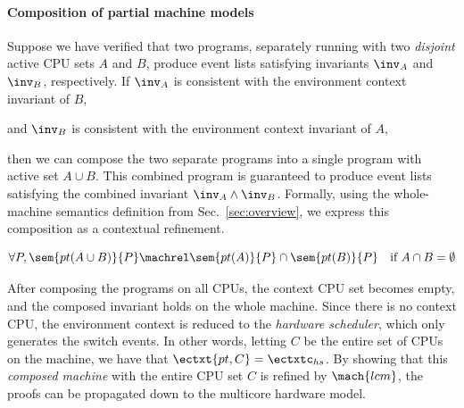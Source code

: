 
\paragraph{Composition of partial machine models}
Suppose we have verified that two programs, separately running with two 
\emph{disjoint} active CPU sets $A$ and $B$, produce event lists
satisfying invariants $\inv_A$ and $\inv_B$, respectively.
If $\inv_A$ is consistent with the environment context invariant
of $B$,
and $\inv_B$ is consistent with the environment context invariant of 
$A$,
then we can compose the two separate programs into a single program
with active set $A \cup B$.
This combined program is guaranteed to produce event lists
satisfying the combined invariant $\inv_A \wedge \inv_B$.
Formally, using the whole-machine semantics definition from
Sec.~\ref{sec:overview}, we express this composition as a contextual 
refinement.

\begin{lemma}\vspace{-2pt}
\label{lemma:compose}
{\small \[\forall P, \sem{pt(A\cup B)}{P}\machrel \sem{pt(A)}{P} \cap \sem{pt(B)}{P}\quad \text{if } A \cap B = \emptyset\]}
\vspace{-17pt}
\ignore{
\[
\begin{array}{l}
\forall \oracle_{A}\  \oracle_{B}\
\oracle_{\overline{A\cup B}},\\
(\mach{pt},
\oracle_{\overline{A\cup B}})_{A\cup B}
= (\mach{pt},
\oracle_B
\cup \oracle_{\overline{A\cup B}})_A \bigcap
(\mach{pt},
\oracle_A \cup \oracle_{\overline{A\cup B}})_B
\end{array}
\]
}
\end{lemma}

After composing the programs on all CPUs, the context CPU set becomes
empty, and the composed invariant holds on the whole machine.
Since there is no context CPU, the environment context is
reduced to the \emph{hardware scheduler}, which only generates the
switch events. In other words, letting $C$ be the entire set of CPUs
on the machine, we have that $\ectxt{pt,C} = \ectxtc_{hs}$.  By
showing that this \emph{composed machine} with the entire CPU set $C$
is refined by $\mach{lcm}$, the proofs can be propagated down to the
multicore hardware model.

